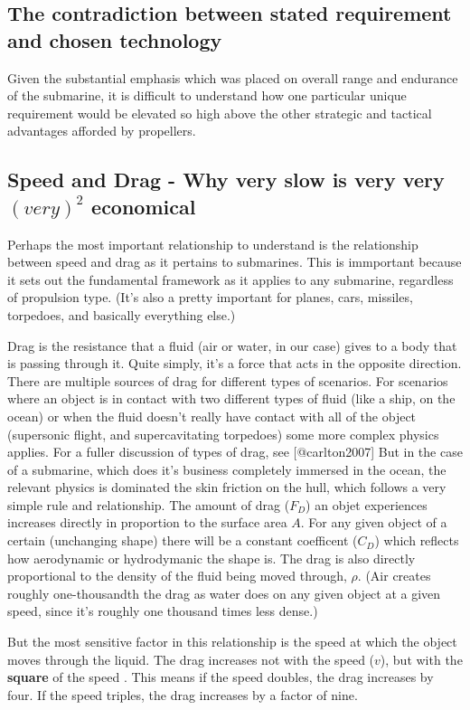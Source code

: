 \documentclass{article}\usepackage[]{graphicx}\usepackage[]{color}
\begin{document}
\subsection{The contradiction between stated requirement and chosen technology}

Given the substantial emphasis which was placed on overall range and endurance of the submarine, it is difficult to understand how one particular unique requirement would be elevated so high above the other strategic and tactical advantages afforded by propellers.

\subsection{Speed and Drag - Why very slow is very very $(very)^2$ economical}


Perhaps the most important relationship to understand is the relationship between speed and drag as it pertains to submarines.  This is immportant because it sets out the fundamental framework as it applies to any submarine, regardless of propulsion type.  (It's also a pretty important for planes, cars, missiles, torpedoes, and basically everything else.)

Drag is the resistance that a fluid (air or water, in our case) gives to a body that is passing through it. Quite simply, it's a force that acts in the opposite direction.  There are multiple sources of drag for different types of scenarios.  For scenarios where an object is in contact with two different types of fluid (like a ship, on the ocean) or when the fluid doesn't really have contact with all of the object (supersonic flight, and supercavitating torpedoes) some more complex physics applies. For a fuller discussion of types of drag, see [@carlton2007]  But in the case of a submarine, which does it's business completely immersed in the ocean, the relevant physics is dominated the skin friction on the hull, which follows a very simple rule and relationship.  The amount of drag ($F_D$) an objet experiences increases directly in proportion to the surface area $A$.  For any given object of a certain (unchanging shape) there will be a constant coefficent ($C_D$) which reflects how aerodynamic or hydrodymanic the shape is.  The drag is also directly proportional to the density of the fluid being moved through, $\rho$.  (Air creates roughly one-thousandth the drag as water does on any given object at a given speed, since it's roughly one thousand times less dense.)

But the most sensitive factor in this relationship is the speed at which the object moves through the liquid.  The drag increases not with the speed ($v$), but with the \textbf{square} of the speed . This means if the speed doubles, the drag increases by four.  If the speed triples, the drag increases by a factor of nine.
\end{document}
